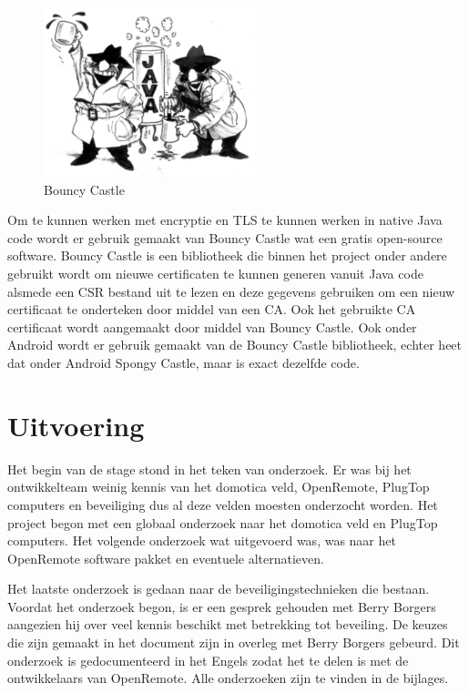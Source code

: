 \documentclass[]{article}
\begin{document}
\begin{figure}
  \begin{center}
    \includegraphics[width=0.55\textwidth]{bouncyjava.pdf}
  \end{center}
  \caption{Bouncy Castle}
\end{figure}
Om te kunnen werken met encryptie en TLS te kunnen werken in native Java code
wordt er gebruik gemaakt van Bouncy Castle wat een gratis open-source software.
Bouncy Castle is een bibliotheek die binnen het project onder andere gebruikt
wordt om nieuwe certificaten te kunnen generen vanuit Java code alsmede een CSR
bestand uit te lezen en deze gegevens gebruiken om een nieuw certificaat te
onderteken door middel van een CA. Ook het gebruikte CA certificaat wordt
aangemaakt door middel van Bouncy Castle. Ook onder Android wordt er gebruik
gemaakt van de Bouncy Castle bibliotheek, echter heet dat onder Android Spongy
Castle, maar is exact dezelfde code.

\newpage
\section{Uitvoering}

Het begin van de stage stond in het teken van onderzoek. Er was bij het
ontwikkelteam weinig kennis van het domotica veld, OpenRemote, PlugTop computers
en beveiliging dus al deze velden moesten onderzocht worden. Het project begon
met een globaal onderzoek naar het domotica veld en PlugTop computers. Het
volgende onderzoek wat uitgevoerd was, was naar het OpenRemote software pakket en
eventuele alternatieven.

Het laatste onderzoek is gedaan naar de beveiligingstechnieken die bestaan.
Voordat het onderzoek begon, is er een gesprek gehouden met Berry Borgers
aangezien hij over veel kennis beschikt met betrekking tot beveiling. De keuzes
die zijn gemaakt in het document zijn in overleg met Berry Borgers gebeurd. Dit
onderzoek is gedocumenteerd in het Engels zodat het te delen is met de
ontwikkelaars van OpenRemote. Alle onderzoeken zijn  te vinden in de bijlages.
\end{document}
